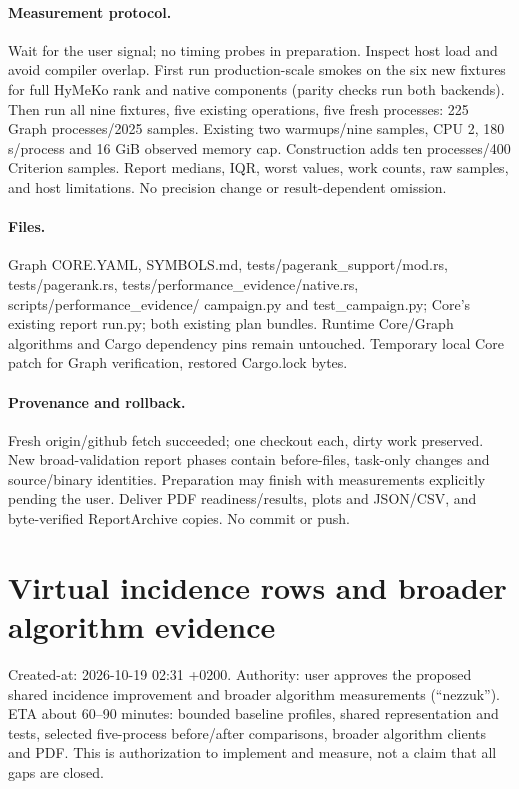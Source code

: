 \documentclass[11pt,a4paper]{article}
\begin{document}
\paragraph{Measurement protocol.} Wait for the user signal; no timing probes in
preparation. Inspect host load and avoid compiler overlap. First run production-scale
smokes on the six new fixtures for full HyMeKo rank and native components (parity
checks run both backends). Then run all nine fixtures, five existing operations,
five fresh processes: 225 Graph processes/2025 samples. Existing two warmups/nine
samples, CPU 2, 180 s/process and 16 GiB observed memory cap. Construction adds ten
processes/400 Criterion samples. Report medians, IQR, worst values, work counts,
raw samples, and host limitations. No precision change or result-dependent omission.
\paragraph{Files.} Graph CORE.YAML, SYMBOLS.md, tests/pagerank\_support/mod.rs,
tests/pagerank.rs, tests/performance\_evidence/native.rs, scripts/performance\_evidence/
campaign.py and test\_campaign.py; Core's existing report run.py; both existing plan
bundles. Runtime Core/Graph algorithms and Cargo dependency pins remain untouched.
Temporary local Core patch for Graph verification, restored Cargo.lock bytes.
\paragraph{Provenance and rollback.} Fresh origin/github fetch succeeded; one
checkout each, dirty work preserved. New broad-validation report phases contain
before-files, task-only changes and source/binary identities. Preparation may finish
with measurements explicitly pending the user. Deliver PDF readiness/results,
plots and JSON/CSV, and byte-verified ReportArchive copies. No commit or push.


\newpage\section*{Virtual incidence rows and broader algorithm evidence}
Created-at: 2026-10-19 02:31 +0200. Authority: user approves the proposed shared
incidence improvement and broader algorithm measurements (``nezzuk''). ETA about
60--90 minutes: bounded baseline profiles, shared representation and tests,
selected five-process before/after comparisons, broader algorithm clients and PDF.
This is authorization to implement and measure, not a claim that all gaps are closed.
\end{document}
